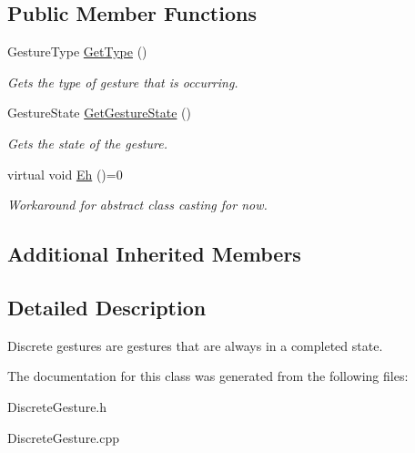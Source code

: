 \subsection*{Public Member Functions}
\begin{DoxyCompactItemize}
\item 
Gesture\+Type \hyperlink{class_efficio_1_1_input_recognition_1_1_discrete_gesture_aa41d3e90b680094da94183a1a1ed3b2a}{Get\+Type} ()\hypertarget{class_efficio_1_1_input_recognition_1_1_discrete_gesture_aa41d3e90b680094da94183a1a1ed3b2a}{}\label{class_efficio_1_1_input_recognition_1_1_discrete_gesture_aa41d3e90b680094da94183a1a1ed3b2a}

\begin{DoxyCompactList}\small\item\em Gets the type of gesture that is occurring. \end{DoxyCompactList}\item 
Gesture\+State \hyperlink{class_efficio_1_1_input_recognition_1_1_discrete_gesture_a18ff1c5231925c581ac3a6add9edfd67}{Get\+Gesture\+State} ()\hypertarget{class_efficio_1_1_input_recognition_1_1_discrete_gesture_a18ff1c5231925c581ac3a6add9edfd67}{}\label{class_efficio_1_1_input_recognition_1_1_discrete_gesture_a18ff1c5231925c581ac3a6add9edfd67}

\begin{DoxyCompactList}\small\item\em Gets the state of the gesture. \end{DoxyCompactList}\item 
virtual void \hyperlink{class_efficio_1_1_input_recognition_1_1_discrete_gesture_a58c1d4f8da3eac837c3cdaf001767bc6}{Eh} ()=0\hypertarget{class_efficio_1_1_input_recognition_1_1_discrete_gesture_a58c1d4f8da3eac837c3cdaf001767bc6}{}\label{class_efficio_1_1_input_recognition_1_1_discrete_gesture_a58c1d4f8da3eac837c3cdaf001767bc6}

\begin{DoxyCompactList}\small\item\em Workaround for abstract class casting for now. \end{DoxyCompactList}\end{DoxyCompactItemize}
\subsection*{Additional Inherited Members}


\subsection{Detailed Description}
Discrete gestures are gestures that are always in a completed state. 

The documentation for this class was generated from the following files\+:\begin{DoxyCompactItemize}
\item 
Discrete\+Gesture.\+h\item 
Discrete\+Gesture.\+cpp\end{DoxyCompactItemize}
